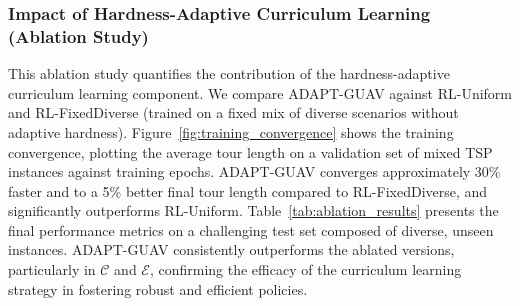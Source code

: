 \documentclass[10pt,conference,letterpaper]{IEEEtran}
\begin{document}

\subsubsection{Impact of Hardness-Adaptive Curriculum Learning (Ablation Study)}
\label{ssubsec:exp_ablation}
This ablation study quantifies the contribution of the hardness-adaptive curriculum learning component. We compare ADAPT-GUAV against RL-Uniform and RL-FixedDiverse (trained on a fixed mix of diverse scenarios without adaptive hardness). Figure~\ref{fig:training_convergence} shows the training convergence, plotting the average tour length on a validation set of mixed TSP instances against training epochs. ADAPT-GUAV converges approximately 30\% faster and to a 5\% better final tour length compared to RL-FixedDiverse, and significantly outperforms RL-Uniform. Table~\ref{tab:ablation_results} presents the final performance metrics on a challenging test set composed of diverse, unseen instances. ADAPT-GUAV consistently outperforms the ablated versions, particularly in $\mathcal{C}$ and $\mathcal{E}$, confirming the efficacy of the curriculum learning strategy in fostering robust and efficient policies.

\end{document}
